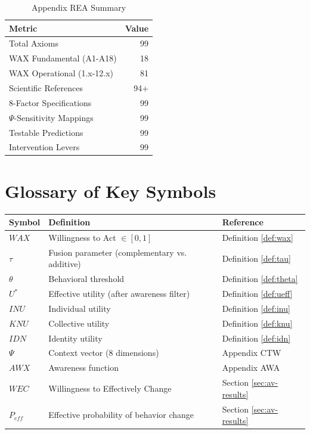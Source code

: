 \begin{table}[htbp]
\centering
\caption{Appendix REA Summary}
\label{tab:av-summary}
\renewcommand{\arraystretch}{1.3}
\begin{tabular}{@{}lr@{}}
\toprule
\textbf{Metric} & \textbf{Value} \\
\midrule
Total Axioms & 99 \\
\quad WAX Fundamental (A1-A18) & 18 \\
\quad WAX Operational (1.x-12.x) & 81 \\
Scientific References & 94+ \\
8-Factor Specifications & 99 \\
$\Psi$-Sensitivity Mappings & 99 \\
Testable Predictions & 99 \\
Intervention Levers & 99 \\
\bottomrule
\end{tabular}
\end{table}



\section{Glossary of Key Symbols}
\label{sec:av-glossary}

\begin{center}
\renewcommand{\arraystretch}{1.3}
\begin{tabular}{@{}lll@{}}
\toprule
\textbf{Symbol} & \textbf{Definition} & \textbf{Reference} \\
\midrule
$WAX$ & Willingness to Act $\in [0,1]$ & Definition \ref{def:wax} \\
$\tau$ & Fusion parameter (complementary vs. additive) & Definition \ref{def:tau} \\
$\theta$ & Behavioral threshold & Definition \ref{def:theta} \\
$U^*$ & Effective utility (after awareness filter) & Definition \ref{def:ueff} \\
$INU$ & Individual utility & Definition \ref{def:inu} \\
$KNU$ & Collective utility & Definition \ref{def:knu} \\
$IDN$ & Identity utility & Definition \ref{def:idn} \\
$\Psi$ & Context vector (8 dimensions) & Appendix CTW \\
$AWX$ & Awareness function & Appendix AWA \\
$WEC$ & Willingness to Effectively Change & Section \ref{sec:av-results} \\
$P_{eff}$ & Effective probability of behavior change & Section \ref{sec:av-results} \\
\bottomrule
\end{tabular}
\end{center}

